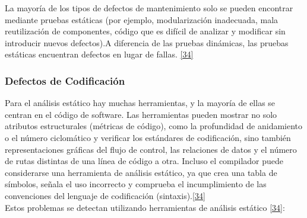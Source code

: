 La mayoría de los tipos de defectos de mantenimiento solo se pueden encontrar mediante pruebas estáticas (por ejemplo, modularización inadecuada, mala reutilización de componentes, código que es difícil de analizar y modificar sin introducir nuevos defectos).A diferencia de las pruebas dinámicas, las pruebas estáticas encuentran defectos en lugar de fallas. \hyperlink{b34}{[34]}\\

\subsubsection {Defectos de Codificación}

Para el análisis estático hay muchas herramientas, y la mayoría de ellas se centran en el código de software. Las herramientas pueden mostrar no solo atributos estructurales (métricas de código), como la profundidad de anidamiento o el número ciclomático y verificar los estándares de codificación, sino también representaciones gráficas del flujo de control, las relaciones de datos y el número de rutas distintas de una línea de código a otra. Incluso el compilador puede considerarse una herramienta de análisis estático, ya que crea una tabla de símbolos, señala el uso incorrecto y comprueba el incumplimiento de las convenciones del lenguaje de codificación (sintaxis).\hyperlink{b34}{[34]} \\

Estos problemas se detectan utilizando herramientas de análisis estático \hyperlink{b34}{[34]}: 

